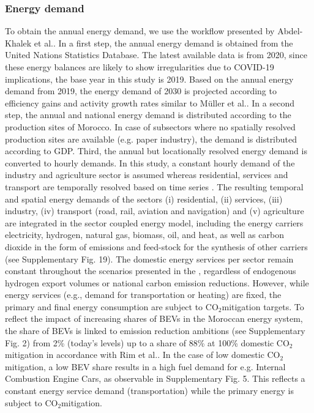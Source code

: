 \documentclass[5p,numafflabel]{elsarticle}
\newcommand{\co}{\ce{CO2}~}
\def\co{CO${}_2${\:}}
\begin{document}
\subsubsection*{Energy demand}
To obtain the annual energy demand, we use the workflow presented by Abdel-Khalek et al.\cite{Abdel-Khalek2025}. In a first step, the annual energy demand is obtained from the United Nations Statistics Database\cite{unstats2023}. The latest available data is from 2020, since these energy balances are likely to show irregularities due to COVID-19 implications, the base year in this study is 2019. Based on the annual energy demand from 2019, the energy demand of 2030 is projected according to efficiency gains and activity growth rates similar to M{\"u}ller et al.\cite{Muller2023}.
In a second step, the annual and national energy demand is distributed according to the production sites of Morocco.
In case of subsectors where no spatially resolved production sites are available (e.g. paper industry), the demand is distributed according to GDP.
Third, the annual but locationally resolved energy demand is converted to hourly demands. In this study, a constant hourly demand of the industry and agriculture sector is assumed whereas residential, services and transport are temporally resolved based on time series \cite{Brown2018a,Neumann2023,Abdel-Khalek2025}. 
The resulting temporal and spatial energy demands of the sectors
(i) residential,
(ii) services,
(iii) industry,
(iv) transport (road, rail, aviation and navigation) and
(v) agriculture
are integrated in the sector coupled energy model, including the energy carriers electricity, hydrogen, natural gas, biomass, oil, and heat, as well as carbon dioxide in the form of emissions and feed-stock for the synthesis of other carriers (see Supplementary Fig. 19). %
The domestic energy services per sector remain constant throughout the scenarios presented in the , regardless of endogenous hydrogen export volumes or national carbon emission reductions. However, while energy services (e.g., demand for transportation or heating) are fixed, the primary and final energy consumption are subject to \co mitigation targets. To reflect the impact of increasing shares of BEVs in the Moroccan energy system, the share of BEVs is linked to emission reduction ambitions (see Supplementary Fig. 2) from 2\% (today's levels) up to a share of 88\% at 100\% domestic \co mitigation in accordance with Rim et al.\cite{Rim2021}. %
In the case of low domestic \co mitigation, a low BEV share results in a high fuel demand for e.g. Internal Combustion Engine Cars, as observable in Supplementary Fig. 5. %
This reflects a constant energy service demand (transportation) while the primary energy is subject to \co mitigation.
\end{document}
